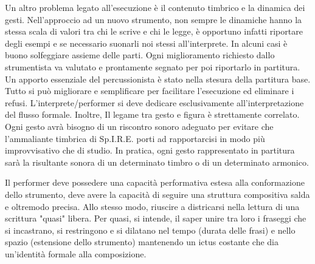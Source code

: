 Un altro problema legato all'esecuzione è il contenuto timbrico e la dinamica dei gesti. Nell'approccio ad un nuovo strumento, non sempre le dinamiche hanno la stessa scala di valori tra chi le scrive e chi le legge, è opportuno infatti riportare degli esempi e se necessario suonarli noi stessi all'interprete. In alcuni casi è buono solfeggiare assieme delle parti. Ogni miglioramento richiesto dallo strumentista va valutato e prontamente segnato per poi riportarlo in partitura. Un apporto essenziale del percussionista è stato nella stesura della partitura base. Tutto si può migliorare e semplificare per facilitare l'esecuzione ed eliminare i refusi. L'interprete/performer si deve dedicare esclusivamente all'interpretazione del flusso formale. Inoltre, Il legame tra gesto e figura è strettamente correlato. Ogni gesto avrà bisogno di un riscontro sonoro adeguato per evitare che l'ammaliante timbrica di Sp.I.R.E. porti ad rapportarcisi in modo più improvvisativo che di studio. In pratica, ogni gesto rappresentato in partitura sarà la risultante sonora di un determinato timbro o di un determinato armonico.

Il performer deve possedere una capacità performativa estesa alla conformazione dello strumento,  deve avere la capacità di seguire una struttura compositiva salda e oltremodo precisa. Allo stesso modo, riuscire a districarsi nella lettura di una scrittura "quasi" libera. Per quasi, si intende, il saper unire tra loro i fraseggi che si incastrano, si restringono e si dilatano nel tempo (durata delle frasi) e nello spazio (estensione dello strumento) mantenendo un ictus costante che dia un'identità formale alla composizione.
